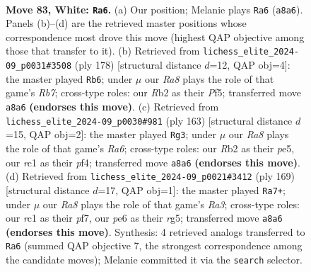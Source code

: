 \documentclass[11pt]{article}
\begin{document}
\clearpage

\begin{figure}[p]\centering
\begin{subfigure}{0.46\textwidth}\centering
\resizebox{\linewidth}{!}{%
\newchessgame
\chessboard[
  setfen={R7/5p2/4p2k/8/P3P3/5PK1/1R6/2r5 w - - 57 83},
  showmover=false,
  pgfstyle=straightmove, color=movearrow, markmove={a8-a6}
]}
\caption{}
\end{subfigure}\hfill
\begin{subfigure}{0.46\textwidth}\centering
\resizebox{\linewidth}{!}{%
\newchessgame
\chessboard[
  setfen={6k1/1R6/5p1p/5P1P/6P1/5K2/8/r7 w - - 89 90},
  showmover=false,
  pgfstyle=straightmove, color=movearrow, markmove={b7-b6}
]}
\caption{}
\end{subfigure}
\\[4pt]
\begin{subfigure}{0.46\textwidth}\centering
\resizebox{\linewidth}{!}{%
\newchessgame
\chessboard[
  setfen={8/p7/5K1k/4P2p/5P2/r7/7p/1R6 b - - 1 82},
  showmover=false,
  pgfstyle=straightmove, color=movearrow, markmove={a3-g3}
]}
\caption{}
\end{subfigure}\hfill
\begin{subfigure}{0.46\textwidth}\centering
\resizebox{\linewidth}{!}{%
\newchessgame
\chessboard[
  setfen={8/4KP1k/r7/6Rp/p4P2/1p6/8/8 b - - 3 85},
  showmover=false,
  pgfstyle=straightmove, color=movearrow, markmove={a6-a7}
]}
\caption{}
\end{subfigure}
\caption{\textbf{Move 83, White: \texttt{Ra6}.} (a) Our position; Melanie plays \texttt{Ra6} (\texttt{a8a6}). Panels (b)--(d) are the retrieved master positions whose correspondence most drove this move (highest QAP objective among those that transfer to it). (b) Retrieved from \texttt{lichess\_elite\_2024-09\_p0031\#3508} (ply 178) [structural distance $d$=12, QAP obj=4]: the master played \texttt{Rb6}; under $\mu$ our \emph{Ra8} plays the role of that game's \emph{Rb7}; cross-type roles: our \emph{R}b2 as their \emph{P}f5; transferred move \texttt{a8a6} \textbf{(endorses this move)}. (c) Retrieved from \texttt{lichess\_elite\_2024-09\_p0030\#981} (ply 163) [structural distance $d$=15, QAP obj=2]: the master played \texttt{Rg3}; under $\mu$ our \emph{Ra8} plays the role of that game's \emph{Ra6}; cross-type roles: our \emph{R}b2 as their \emph{p}e5, our \emph{r}c1 as their \emph{p}f4; transferred move \texttt{a8a6} \textbf{(endorses this move)}. (d) Retrieved from \texttt{lichess\_elite\_2024-09\_p0021\#3412} (ply 169) [structural distance $d$=17, QAP obj=1]: the master played \texttt{Ra7+}; under $\mu$ our \emph{Ra8} plays the role of that game's \emph{Ra3}; cross-type roles: our \emph{r}c1 as their \emph{p}f7, our \emph{p}e6 as their \emph{r}g5; transferred move \texttt{a8a6} \textbf{(endorses this move)}. Synthesis: 4 retrieved analogs transferred to \texttt{Ra6} (summed QAP objective 7, the strongest correspondence among the candidate moves); Melanie committed it via the \texttt{search} selector.}
\label{fig:thought-m164}
\end{figure}
\end{document}
